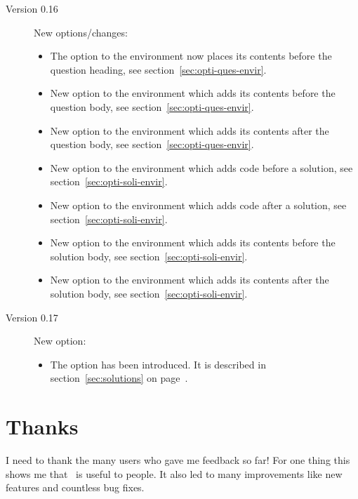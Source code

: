 \documentclass[load-preamble+,scrartcl={DIV10}]{cnltx-doc}
\begin{document}
\begin{description}
\item[Version 0.16]
  New options/changes:
  \begin{itemize}
    \item The option  to the  environment now
      places its contents before the question heading, see
      section~\ref{sec:opti-ques-envir}.
    \item New option  to the  environment
      which adds its contents before the question body, see
      section~\ref{sec:opti-ques-envir}.
    \item New option  to the  environment
      which adds its contents after the question body, see
      section~\ref{sec:opti-ques-envir}.
    \item New option  to the  environment which
      adds code before a solution, see section~\ref{sec:opti-soli-envir}.
    \item New option  to the  environment which
      adds code after a solution, see section~\ref{sec:opti-soli-envir}.
    \item New option  to the  environment
      which adds its contents before the solution body, see
      section~\ref{sec:opti-soli-envir}.
    \item New option  to the  environment
      which adds its contents after the solution body, see
      section~\ref{sec:opti-soli-envir}.
  \end{itemize}

\item[Version 0.17]
  New option:
  \begin{itemize}
    \item The option  has been introduced. It
      is described in section~\ref{sec:solutions} on
      page~\pageref{option:use-saved-counter-format}.
  \end{itemize}
\end{description}


\section{Thanks}
I need to thank the many users who gave me feedback so far!  For one thing
this shows me that \ExSheets\ is useful to people.  It also led to many
improvements like new features and countless bug fixes.
\end{document}
